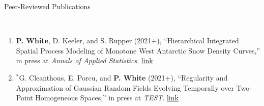 \documentclass[12pt]{article}
\newcommand{\head}[1]{ %
    \bigskip %
    \begin{large}\begin{bf}{#1}\end{bf}\end{large} %

    \ \\ [-1.3cm] %

    \hrulefill}
\begin{document}
\vspace{2mm}
\head{Peer-Reviewed Publications}

\begin{enumerate}[label=$\bullet$]


\item \textbf{P. White}, D. Keeler, and S. Rupper (2021+), ``Hierarchical Integrated Spatial Process Modeling of Monotone West Antarctic Snow Density Curves,'' in press at \textit{Annals of Applied Statistics}. \href{https://www.e-publications.org/ims/submission/AOAS/user/submissionFile/47577?confirm=f5b6994f}{link}

\item $^*$G. Cleanthous, E. Porcu, and \textbf{P. White} (2021+), ``Regularity and Approximation of Gaussian Random Fields Evolving Temporally over Two-Point Homogeneous Spaces,'' in press at \textit{TEST}.  \href{https://link.springer.com/article/10.1007/s11749-021-00755-1}{link}



\end{enumerate}
\end{document}

